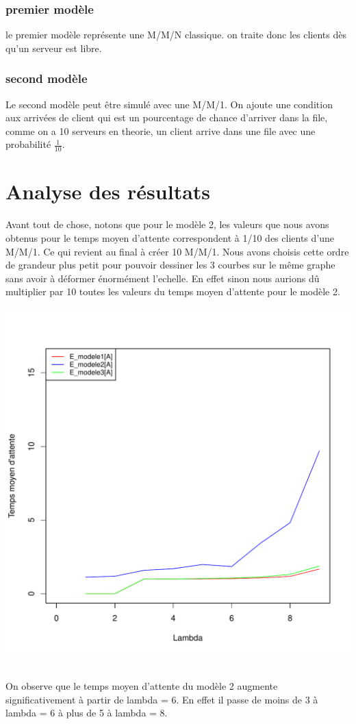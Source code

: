 \documentclass[a4paper,11pt]{article}
\begin{document}
	\subsubsection{premier modèle}
		le premier modèle représente une M/M/N classique. on traite donc les clients dès qu'un serveur est libre.
	\subsubsection{second modèle}
		Le second modèle peut être simulé avec une M/M/1. On ajoute une condition aux arrivées de client qui est un pourcentage de chance d'arriver dans la file, comme on a 10 serveurs en theorie, un client arrive dans une file avec une probabilité $\frac{1}{10}$.
	
\section{Analyse des résultats}
	Avant tout de chose, notons que pour le modèle 2, les valeurs que nous avons obtenus pour le temps moyen d'attente
	correspondent à 1/10 des clients d'une M/M/1. Ce qui revient au final à créer 10 M/M/1. Nous avons choisis cette ordre de grandeur
	plus petit pour pouvoir dessiner les 3 courbes sur le même graphe sans avoir à déformer énormément l'echelle. En effet sinon nous aurions dû 
	multiplier par 10 toutes les valeurs du temps moyen d'attente pour le modèle 2.\\
	\centerline{\includegraphics[scale=0.8]{E[A].pdf}}\\
	On observe que le temps moyen d'attente du modèle 2 augmente significativement à partir de lambda = 6. En effet il passe de moins de 3 à lambda = 6 à plus de 5 à lambda = 8.
	
\end{document}
